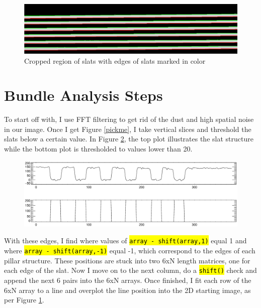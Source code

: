 \documentclass[10pt]{scrartcl}
\begin{document}
\begin{figure}[!ht]
    \centering
    \includegraphics[width=\textwidth]{../plots_tables_images/lines}
    \caption{Cropped region of slats with edges of slats marked in color}
    \label{test}
\end{figure}




\section{Bundle Analysis Steps} %
\label{sec:bundle_analysis_steps}

To start off with, I use FFT filtering to get rid of the dust and high spatial noise in our image. Once I get Figure \ref{pickme}, I take vertical slices and threshold the slats below a certain value. In Figure \ref{findedge}, the top plot illustrates the slat structure while the bottom plot is thresholded to values lower than 20.

\begin{figure}[!ht]
    \centering
    \includegraphics[width=.8\textwidth]{../plots_tables_images/findedge}
    \caption{}
    \label{findedge}
\end{figure}

With these edges, I find where values of \hl{\texttt{array - shift(array,1)}} equal 1 and where \hl{\texttt{array - shift(array,-1)}} equal -1, which correspond to the edges of each pillar structure. These positions are stuck into two 6xN length matrices, one for each edge of the slat. Now I move on to the next column, do a \hl{\texttt{shift()}} check and append the next 6 pairs into the 6xN arrays. Once finished, I fit each row of the 6xN array to a line and overplot the line position into the 2D starting image, as per Figure \ref{test}.

\end{document}
